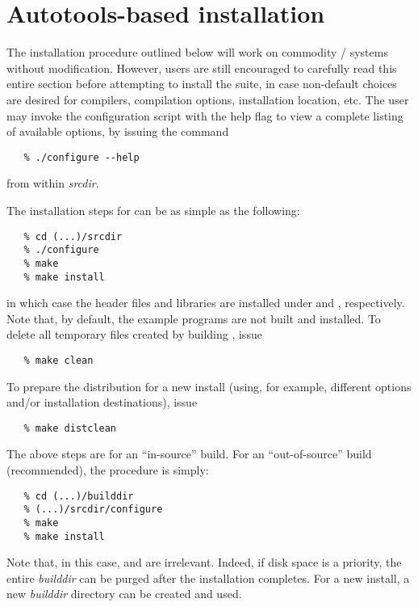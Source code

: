 \section{Autotools-based installation}\label{s:autotool_inst}

The installation procedure outlined below will work on commodity {\linux}/{\unix} 
systems without modification. However, users are still encouraged to carefully read 
this entire section before attempting to install the {\sundials} suite, in case
non-default choices are desired for compilers, compilation options,
installation location, etc.  The user may invoke the configuration
script with the help flag to view a complete listing of available
options, by issuing the command
\begin{verbatim}
   % ./configure --help 
\end{verbatim}
from within {\em srcdir}.

\vspace{0.2in}
{\noindent}The installation steps for {\sundials} can be as simple as
the following: 
\begin{verbatim}
   % cd (...)/srcdir
   % ./configure
   % make
   % make install
\end{verbatim}
in which case the {\sundials} header files and libraries are installed
under  and ,
respectively. Note that, by default, the example programs are not
built and installed.
To delete all temporary files created by building {\sundials}, issue
\begin{verbatim}
   % make clean
\end{verbatim}
To prepare the {\sundials} distribution for a new install (using, for example,
different options and/or installation destinations), issue
\begin{verbatim}
   % make distclean
\end{verbatim}

The above steps are for an ``in-source'' build. For an ``out-of-source'' build (recommended),
the procedure is simply:
\begin{verbatim}
   % cd (...)/builddir
   % (...)/srcdir/configure
   % make
   % make install
\end{verbatim}
Note that, in this case,  and  are
irrelevant. Indeed, if disk space is a priority, the entire {\em
builddir} can be purged after the installation completes. For a new
install, a new {\em builddir} directory can be created and used.

